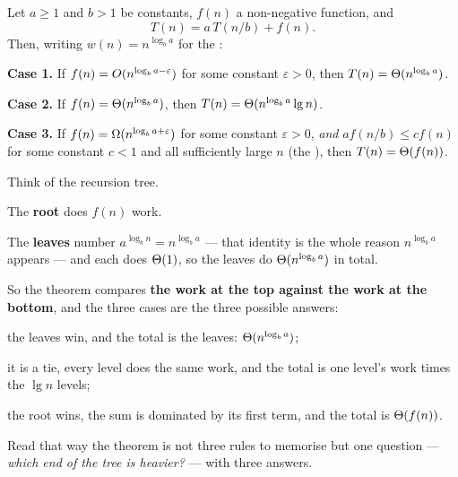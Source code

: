\begin{theorem}\label{thm:master}
Let $a \ge 1$ and $b > 1$ be constants, $f(n)$ a non-negative function, and
\[ T(n) = a\,T(n/b) + f(n). \]
Then, writing $w(n) = n^{\log_{b} a}$ for the :

\smallskip
\textbf{Case 1.} If $f(n) = O(n^{\log_{b} a - \varepsilon})$ for some
constant $\varepsilon > 0$, then $T(n) = \Theta(n^{\log_{b} a})$.

\smallskip
\textbf{Case 2.} If $f(n) = \Theta(n^{\log_{b} a})$, then
$T(n) = \Theta(n^{\log_{b} a} \operatorname{lg} n)$.

\smallskip
\textbf{Case 3.} If $f(n) = \Omega(n^{\log_{b} a + \varepsilon})$ for some
constant $\varepsilon > 0$, \emph{and} $a f(n/b) \le c f(n)$ for some constant
$c < 1$ and all sufficiently large $n$ (the ), then
$T(n) = \Theta(f(n))$.
\end{theorem}

\begin{conceptbox}
Think of the recursion tree.

\begin{tight}
  \item The \textbf{root} does $f(n)$ work.
  \item The \textbf{leaves} number $a^{\log_{b} n} = n^{\log_{b} a}$ --- that
        identity is the whole reason $n^{\log_{b} a}$ appears --- and each does
        $\Theta(1)$, so the leaves do $\Theta(n^{\log_{b} a})$ in total.
\end{tight}

\smallskip
So the theorem compares \textbf{the work at the top against the work at the
bottom}, and the three cases are the three possible answers:

\begin{tightnum}
  \item the leaves win, and the total is the leaves: $\Theta(n^{\log_{b} a})$;
  \item it is a tie, every level does the same work, and the total is one
        level's work times the $\lg n$ levels;
  \item the root wins, the sum is dominated by its first term, and the total is
        $\Theta(f(n))$.
\end{tightnum}

\smallskip
Read that way the theorem is not three rules to memorise but one question ---
\emph{which end of the tree is heavier?} --- with three answers.
\end{conceptbox}

